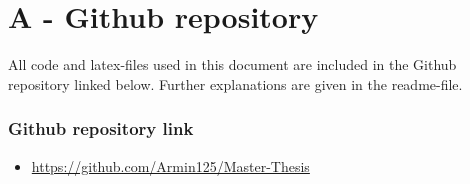 

\chapter*{A - Github repository}

All code and latex-files used in this document are included in the Github repository linked below. Further explanations are given in the readme-file. 


\subsection*{Github repository link}
\begin{itemize}
    \item \url{https://github.com/Armin125/Master-Thesis}
\end{itemize}










